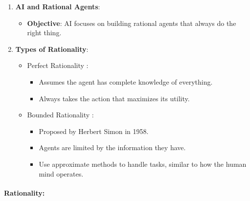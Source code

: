 \documentclass[
]{article}
\begin{document}
\begin{enumerate}
\def\labelenumi{\arabic{enumi}.}
\item
  \textbf{AI and Rational Agents}:

  \begin{itemize}
  \item
    \textbf{Objective}: AI focuses on building rational agents that
    always do the right thing.
  \end{itemize}
\item
  \textbf{Types of Rationality}:

  \begin{itemize}
  \item
    Perfect Rationality :

    \begin{itemize}
    \item
      Assumes the agent has complete knowledge of everything.
    \item
      Always takes the action that maximizes its utility.
    \end{itemize}
  \item
    Bounded Rationality :

    \begin{itemize}
    \item
      Proposed by Herbert Simon in 1958.
    \item
      Agents are limited by the information they have.
    \item
      Use approximate methods to handle tasks, similar to how the human
      mind operates.
    \end{itemize}
  \end{itemize}
\end{enumerate}

\paragraph{Rationality:}\label{rationality}
\end{document}
